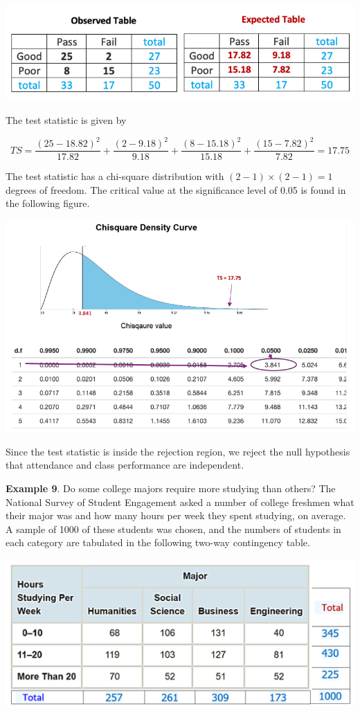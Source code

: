 \documentclass[
]{article}
\begin{document}
\begin{center}\includegraphics[width=0.7\linewidth]{week13/example08ExpObs} \end{center}

The test statistic is given by

\[
TS = \frac{(25-18.82)^2}{17.82} + \frac{(2-9.18)^2}{9.18} + \frac{(8-15.18)^2}{15.18} + \frac{(15-7.82)^2}{7.82} = 17.75
\]

The test statistic has a chi-square distribution with
\((2-1)\times (2-1) = 1\) degrees of freedom. The critical value at the
significance level of 0.05 is found in the following figure.

\begin{center}\includegraphics[width=0.85\linewidth]{week13/example08ChisqCV} \end{center}

Since the test statistic is inside the rejection region, we reject the
null hypothesis that attendance and class performance are independent.

\textbf{Example 9}. Do some college majors require more studying than
others? The National Survey of Student Engagement asked a number of
college freshmen what their major was and how many hours per week they
spent studying, on average. A sample of 1000 of these students was
chosen, and the numbers of students in each category are tabulated in
the following two-way contingency table.

\begin{center}\includegraphics[width=0.6\linewidth]{week13/example09Data} \end{center}
\end{document}
